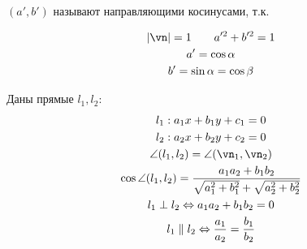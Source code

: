 \documentclass[main]{subfiles}
\begin{document}
$(a', b')$ называют направляющими косинусами, т.к.
\begin{center}
\end{center}
\begin{gather*}
    |\vn| = 1 \qquad a'^2 + b'^2 = 1\\
    a' = \cos \alpha\\
    b' = \sin \alpha = \cos \beta
\end{gather*}

Даны прямые $l_1, l_2$:
\begin{gather*}
    l_1: a_1x +b_1y + c_1 = 0\\
    l_2: a_2x +b_2y + c_2 = 0\\
    \angle(l_1, l_2) = \angle (\vn_1, \vn_2)\\
    \cos \angle(l_1, l_2) = \frac{a_1a_2+b_1b_2}{\sqrt{a_1^2 + b_1^2} + \sqrt{a_2^2 + b_2^2}}\\
    l_1 \perp l_2 \Leftrightarrow a_1 a_2 + b_1 b_2 = 0\\
    l_1 \parallel l_2 \Leftrightarrow \frac{a_1}{a_2} = \frac{b_1}{b_2}
\end{gather*}
\end{document}
